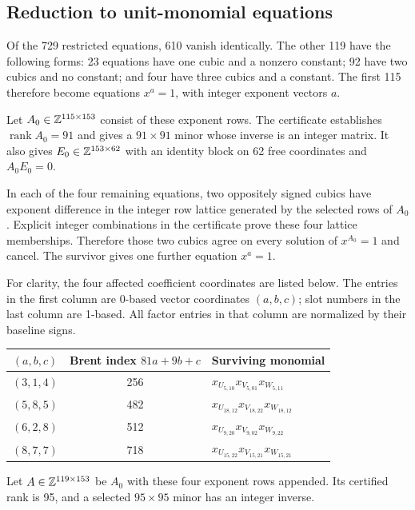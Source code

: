 \documentclass[11pt,letterpaper]{article}
\theoremstyle{definition}\newtheorem{definition}[theorem]{Definition}
\theoremstyle{remark}\newtheorem{remark}[theorem]{Remark}
\DeclareMathOperator{\rank}{rank}\DeclareMathOperator{\tr}{tr}
\begin{document}
\subsection{Reduction to unit-monomial equations}
Of the 729 restricted equations, 610 vanish identically. The other 119
have the following forms: 23 equations have one cubic and a nonzero
constant; 92 have two cubics and no constant; and four have three cubics
and a constant. The first 115 therefore become equations $x^a=1$, with
integer exponent vectors $a$.

Let $A_0\in\mathbb Z^{115\times153}$ consist of these exponent rows. The
certificate establishes $\rank A_0=91$ and gives a $91\times91$ minor
whose inverse is an integer matrix. It also gives
$E_0\in\mathbb Z^{153\times62}$ with an identity block on 62 free coordinates
and $A_0E_0=0$.

In each of the four remaining equations, two oppositely signed cubics
have exponent difference in the integer row lattice generated by the
selected rows of $A_0$. Explicit integer combinations in the certificate
prove these four lattice memberships. Therefore those two cubics agree
on every solution of $x^{A_0}=1$ and cancel. The survivor gives one further
equation $x^a=1$.

For clarity, the four affected coefficient coordinates are listed below.
The entries in the first column are 0-based vector coordinates $(a,b,c)$;
slot numbers in the last column are 1-based. All factor entries in that
column are normalized by their baseline signs.
\begin{center}
\begin{tabular}{ccp{}}
\toprule
$(a,b,c)$ & Brent index $81a+9b+c$ & Surviving monomial \\
\midrule
$(3,1,4)$ & 256 & $x_{U_{5,10}}x_{V_{5,01}}x_{W_{5,11}}$ \\
$(5,8,5)$ & 482 & $x_{U_{18,12}}x_{V_{18,22}}x_{W_{18,12}}$ \\
$(6,2,8)$ & 512 & $x_{U_{9,20}}x_{V_{9,02}}x_{W_{9,22}}$ \\
$(8,7,7)$ & 718 & $x_{U_{15,22}}x_{V_{15,21}}x_{W_{15,21}}$ \\
\bottomrule
\end{tabular}
\end{center}
Let $A\in\mathbb Z^{119\times153}$ be $A_0$ with these four exponent rows
appended. Its certified rank is 95, and a selected $95\times95$ minor has
an integer inverse.
\end{document}
